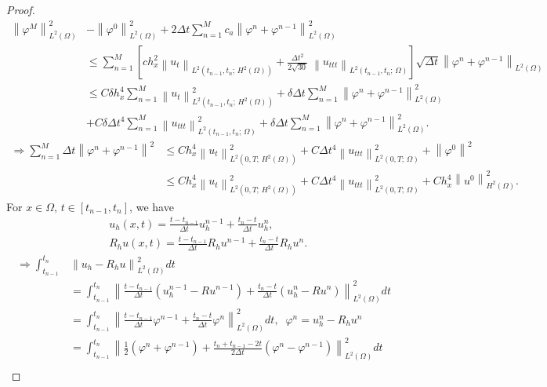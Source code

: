 \documentclass[]{article}
\begin{document}
\begin{proof}
	\begin{align*}
	\left\|\varphi^M\right\|^2_{L^2(\Omega)}&-\left\|\varphi^{0}\right\|^2_{L^2(\Omega)}+2\Delta t\sum_{n=1}^{M}c_a\left\|\varphi^n+\varphi^{n-1}\right\|^2_{L^2(\Omega)}\\
	&\leq\sum_{n=1}^{M}\left[ch_x^2\left\|u_t\right\|_{L^2\left(t_{n-1}, t_n;\, H^2(\Omega)\right)}+\frac{\Delta t^2}{2\sqrt{30}}\;\left\|u_{ttt}\right\|_{L^2(t_{n-1}, t_n;\, \Omega)}\right]\sqrt{\Delta t}\left\|\varphi^n+\varphi^{n-1}\right\|_{L^2(\Omega)}\\
	&\leq C\delta h_x^4\sum_{n=1}^{M}\left\|u_t\right\|_{L^2\left(t_{n-1}, t_n;\, H^2(\Omega)\right)}^2+\delta \Delta t\sum_{n=1}^{M}\left\|\varphi^n+\varphi^{n-1}\right\|^2_{L^2(\Omega)}\\
	&+C\delta \Delta t^4\sum_{n=1}^{M}\left\|u_{ttt}\right\|_{L^2(t_{n-1}, t_n;\, \Omega)}^2+\delta \Delta t\sum_{n=1}^{M}\left\|\varphi^n+\varphi^{n-1}\right\|^2_{L^2(\Omega)}.
	\end{align*}
	\begin{align*}
	\Rightarrow\sum_{n=1}^{M}\Delta t\left\|\varphi^n+\varphi^{n-1}\right\|^2&\leq C h_x^4\left\|u_t\right\|_{L^2\left(0, T;\, H^2(\Omega)\right)}^2+C \Delta t^4\left\|u_{ttt}\right\|_{L^2(0, T;\, \Omega)}^2+\left\|\varphi^{0}\right\|^2\\
	&\leq C h_x^4\left\|u_t\right\|_{L^2\left(0, T;\, H^2(\Omega)\right)}^2+C \Delta t^4\left\|u_{ttt}\right\|_{L^2(0, T;\, \Omega)}^2+Ch_x^4\left\|u^{0}\right\|^2_{H^2(\Omega)}.
	\end{align*}
	For $x\in \Omega,\, t\in [t_{n-1}, t_n]$, we have
	\begin{align*}
		&u_h(x, t)=\frac{t-t_{n-1}}{\Delta t}u_h^{n-1}+\frac{t_n-t}{\Delta t}u_h^{n},\\
		&R_hu(x, t)=\frac{t-t_{n-1}}{\Delta t}R_hu^{n-1}+\frac{t_n-t}{\Delta t}R_hu^{n}.
	\end{align*}
	\begin{align*}
		\Rightarrow \int_{t_{n-1}}^{t_n}&\left\|u_h-R_hu\right\|_{L^2(\Omega)}^2dt\\&= \int_{t_{n-1}}^{t_n}\left\|\frac{t-t_{n-1}}{\Delta t}\left(u_h^{n-1}-Ru^{n-1}\right)+\frac{t_n-t}{\Delta t}\left(u_h^{n}-Ru^n\right)\right\|_{L^2(\Omega)}^2dt\\
		&= \int_{t_{n-1}}^{t_n}\left\|\frac{t-t_{n-1}}{\Delta t}\varphi^{n-1}+\frac{t_n-t}{\Delta t}\varphi^n\right\|_{L^2(\Omega)}^2dt,\;\; \varphi^n=u_h^n-R_hu^n\\
		&=\int_{t_{n-1}}^{t_n}\left\|\frac{1}{2}\left(\varphi^n+\varphi^{n-1}\right)+\frac{t_n+t_{n-1}-2t}{2\Delta t}\left(\varphi^n-\varphi^{n-1}\right)\right\|_{L^2(\Omega)}^2dt\\

\end{align*}
\end{proof}
\end{document}

